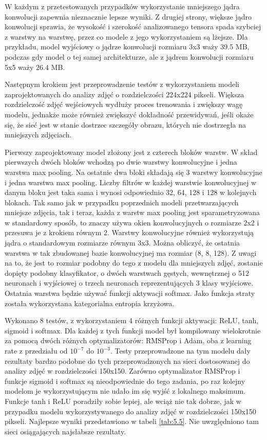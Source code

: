 W każdym z przetestowanych przypadków wykorzystanie mniejszego jądra konwolucji zapewnia nieznacznie lepsze wyniki. Z drugiej strony, większe jądro konwolucji sprawia, że wysokość i szerokość analizowanego tensora spada szybciej z warstwy na warstwę, przez co modele z jego wykorzystaniem są lżejsze. Dla przykładu, model wyjściowy o jądrze konwolucji rozmiaru 3x3 waży 39.5 MB, podczas gdy model o tej samej architekturze, ale z jądrem konwolucji rozmiaru 5x5 waży 26.4 MB.

Następnym krokiem jest przeprowadzenie testów z wykorzystaniem modeli zaprojektowanych do analizy zdjęć o rozdzielczości 224x224 pikseli. Większa rozdzielczość zdjęć wejściowych wydłuży proces trenowania i zwiększy wagę modelu, jednakże może również zwiększyć dokładność przewidywań, jeśli okaże się, że sieć jest w stanie dostrzec szczegóły obrazu, których nie dostrzegła na mniejszych zdjęciach.

Pierwszy zaprojektowany model złożony jest z czterech bloków warstw. W skład pierwszych dwóch bloków wchodzą po dwie warstwy konwolucyjne i jedna warstwa max pooling. Na ostatnie dwa bloki składają się 3 warstwy konwolucyjne i jedna warstwa max pooling. Liczby filtrów w każdej warstwie konwolucyjnej w danym bloku jest taka sama i wynosi odpowiednio 32, 64, 128 i 128 w kolejnych blokach. Tak samo jak w przypadku poprzednich modeli przetwarzających mniejsze zdjęcia, tak i teraz, każda z warstw max pooling jest sparametryzowana w standardowy sposób, to znaczy używa okien konwolucyjnych o rozmiarze 2x2 i przesuwa je z krokiem równym 2. Warstwy konwolucyjne również wykorzystują jądra o standardowym rozmiarze równym 3x3. Można obliczyć, że ostatnia warstwa w tak zbudowanej bazie konwolucyjnej ma rozmiar (8, 8, 128). Z uwagi na to, że jest to rozmiar podobny do tego z modelu dla mniejszych zdjęć, zostanie dopięty podobny klasyfikator, o dwóch warstwach gęstych, wewnętrznej o 512 neuronach i wyjściowej o trzech neuronach reprezentujących 3 klasy wyjściowe. Ostatnia warstwa będzie używać funkcji aktywacji softmax. Jako funkcja straty została wykorzystana kategorialna entropia krzyżowa.

Wykonano 8 testów, z wykorzystaniem 4 różnych funkcji aktywacji: ReLU, tanh, sigmoid i softmax. Dla każdej z tych funkcji model był kompilowany wielokrotnie za pomocą dwóch różnych optymalizatorów: RMSProp i Adam, oba z learning rate z przedziału od $10^{-7}$ do $10^{-3}$. Testy przeprowadzone na tym modelu dały rezultaty bardzo podobne do tych przeprowadzonych na sieci dostosowanej do analizy zdjęć w rozdzielczości 150x150. Zarówno optymalizator RMSProp i funkcje sigmoid i softmax są nieodpowiednie do tego zadania, po raz kolejny modelom je wykorzystującym nie udało im się wyjść z lokalnego maksimum. Funkcje tanh i ReLU poradziły sobie lepiej, ale wciąż nie tak dobrze, jak w przypadku modelu wykorzystywanego do analizy zdjęć w rozdzielczości 150x150 pikseli. Najlepsze wyniki przedstawiono w tabeli \ref{tab:5.5}. Nie uwzględniono tam sieci osiągających najsłabsze rezultaty.

